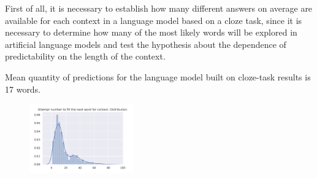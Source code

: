 \documentclass[a4paper]{article}
\begin{document}
First of all, it is necessary to establish how many different answers on average are available for each context in a language model based on a cloze task, since it is necessary to determine how many of the most likely words will be explored in artificial language models and test the hypothesis about the dependence of predictability on the length of the context.

Mean quantity of predictions for the language model built on cloze-task results is 17 words.

\begin{figure}
\centering
\includegraphics[width=0.4\textwidth]{figures/pdf/num-fill-context-dist.pdf}
\end{figure}
\end{document}
